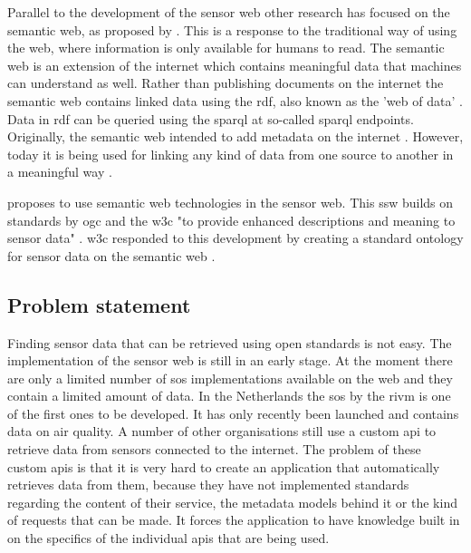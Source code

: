 Parallel to the development of the sensor web other research has focused on the semantic web, as proposed by \cite{LD:Berners-lee}. This is a response to the traditional way of using the web, where information is only available for humans to read. The semantic web is an extension of the internet which contains meaningful data that machines can understand as well. Rather than publishing documents on the internet the semantic web contains linked data using the \ac{rdf}, also known as the 'web of data' \citep{LD:Bizer}. Data in \ac{rdf} can be queried using the \ac{sparql} at so-called \ac{sparql} endpoints. Originally, the semantic web intended to add metadata on the internet \citep{LD:W3C}. However, today it is being used for linking any kind of data from one source to another in a meaningful way \citep{LD:Cambridge}. 

\cite{SSW:Sheth} proposes to use semantic web technologies in the sensor web. This \ac{ssw} builds on standards by \ac{ogc} and the \ac{w3c} "to provide enhanced descriptions and meaning to sensor data" \cite[p.78]{SSW:Sheth}. \ac{w3c} responded to this development by creating a standard ontology for sensor data on the semantic web \citep{SSW:SSN_incubatorGroup}. 
 
\subsection{Problem statement}
Finding sensor data that can be retrieved using open standards is not easy. The implementation of the sensor web is still in an early stage. At the moment there are only a limited number of \ac{sos} implementations available on the web and they contain a limited amount of data. In the Netherlands the \ac{sos} by the \ac{rivm} is one of the first ones to be developed. It has only recently been launched and contains data on air quality. A number of other organisations still use a custom \ac{api} to retrieve data from sensors connected to the internet. The problem of these custom \ac{api}s is that it is very hard to create an application that automatically retrieves data from them, because they have not implemented standards regarding the content of their service, the metadata models behind it or the kind of requests that can be made. It forces the application to have knowledge built in on the specifics of the individual \ac{api}s that are being used.  

